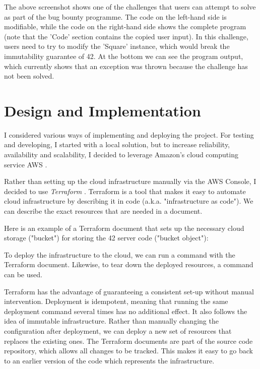 
The above screenshot shows one of the challenges that users can attempt to solve as part of the bug bounty programme. The code on the left-hand side is modifiable, while the code on the right-hand side shows the complete program (note that the 'Code' section contains the copied user input). In this challenge, users need to try to modify the 'Square' instance, which would break the immutability guarantee of 42. At the bottom we can see the program output, which currently shows that an exception was thrown because the challenge has not been solved.

\chapter{Design and Implementation}


I considered various ways of implementing and deploying the project. For testing and developing, I started with a local solution, but to increase reliability, availability and scalability, I decided to leverage Amazon's cloud computing service AWS \cite{amazon-2022A}.

Rather than setting up the cloud infrastructure manually via the AWS Console, I decided to use \emph{Terraform} \cite{hashicorp-2022}. Terraform is a tool that makes it easy to automate cloud infrastructure by describing it in code (a.k.a. "infrastructure as code"). We can describe the exact resources that are needed in a document.

Here is an example of a Terraform document that sets up the necessary cloud storage ("bucket") for storing the 42 server code ("bucket object"):


To deploy the infrastructure to the cloud, we can run a  command with the Terraform document. Likewise, to tear down the deployed resources, a  command can be used.

Terraform has the advantage of guaranteeing a consistent set-up without manual intervention. Deployment is idempotent, meaning that running the same deployment command several times has no additional effect. It also follows the idea of immutable infrastructure. Rather than manually changing the configuration after deployment, we can deploy a new set of resources that replaces the existing ones. The Terraform documents are part of the source code repository, which allows all changes to be tracked. This makes it easy to go back to an earlier version of the code which represents the infrastructure.

